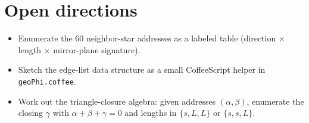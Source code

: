 \documentclass[11pt]{article}
\begin{document}
\section{Open directions}

\begin{itemize}
  \item Enumerate the 60 neighbor-star addresses as a labeled table
        (direction \(\times\) length \(\times\) mirror-plane signature).
  \item Sketch the edge-list data structure as a small CoffeeScript helper
        in \texttt{geoPhi.coffee}.
  \item Work out the triangle-closure algebra: given addresses
        \((\alpha,\beta)\), enumerate the closing \(\gamma\) with
        \(\alpha+\beta+\gamma=0\) and lengths in \(\{s,L,L\}\) or
        \(\{s,s,L\}\).
\end{itemize}
\end{document}
